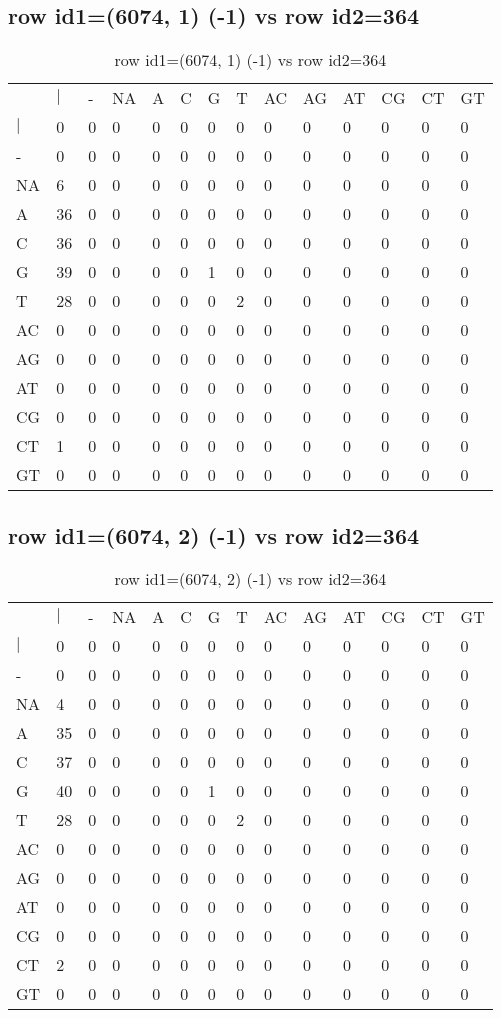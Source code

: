 \subsection{row id1=(6074, 1) (-1) vs row id2=364}
\begin{center}
\begin{longtable}{|l|l|l|l|l|l|l|l|l|l|l|l|l|l|}
\caption{row id1=(6074, 1) (-1) vs row id2=364} \label{table_dm42}\\
\hline
\\
\hline
&$|$&-&NA&A&C&G&T&AC&AG&AT&CG&CT&GT\\
$|$&0&0&0&0&0&0&0&0&0&0&0&0&0\\
-&0&0&0&0&0&0&0&0&0&0&0&0&0\\
NA&6&0&0&0&0&0&0&0&0&0&0&0&0\\
A&36&0&0&0&0&0&0&0&0&0&0&0&0\\
C&36&0&0&0&0&0&0&0&0&0&0&0&0\\
G&39&0&0&0&0&1&0&0&0&0&0&0&0\\
T&28&0&0&0&0&0&2&0&0&0&0&0&0\\
AC&0&0&0&0&0&0&0&0&0&0&0&0&0\\
AG&0&0&0&0&0&0&0&0&0&0&0&0&0\\
AT&0&0&0&0&0&0&0&0&0&0&0&0&0\\
CG&0&0&0&0&0&0&0&0&0&0&0&0&0\\
CT&1&0&0&0&0&0&0&0&0&0&0&0&0\\
GT&0&0&0&0&0&0&0&0&0&0&0&0&0\\
\hline
\end{longtable}
\end{center}

\subsection{row id1=(6074, 2) (-1) vs row id2=364}
\begin{center}
\begin{longtable}{|l|l|l|l|l|l|l|l|l|l|l|l|l|l|}
\caption{row id1=(6074, 2) (-1) vs row id2=364} \label{table_dm44}\\
\hline
\\
\hline
&$|$&-&NA&A&C&G&T&AC&AG&AT&CG&CT&GT\\
$|$&0&0&0&0&0&0&0&0&0&0&0&0&0\\
-&0&0&0&0&0&0&0&0&0&0&0&0&0\\
NA&4&0&0&0&0&0&0&0&0&0&0&0&0\\
A&35&0&0&0&0&0&0&0&0&0&0&0&0\\
C&37&0&0&0&0&0&0&0&0&0&0&0&0\\
G&40&0&0&0&0&1&0&0&0&0&0&0&0\\
T&28&0&0&0&0&0&2&0&0&0&0&0&0\\
AC&0&0&0&0&0&0&0&0&0&0&0&0&0\\
AG&0&0&0&0&0&0&0&0&0&0&0&0&0\\
AT&0&0&0&0&0&0&0&0&0&0&0&0&0\\
CG&0&0&0&0&0&0&0&0&0&0&0&0&0\\
CT&2&0&0&0&0&0&0&0&0&0&0&0&0\\
GT&0&0&0&0&0&0&0&0&0&0&0&0&0\\
\hline
\end{longtable}
\end{center}

